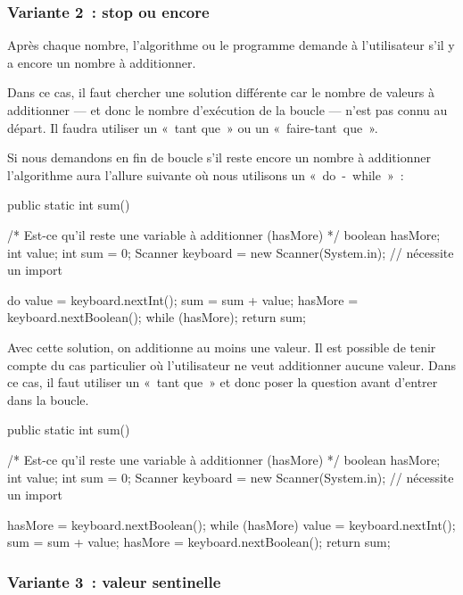 	\subsubsection{Variante 2~: stop ou encore}
	
		Après chaque nombre, l'algorithme ou le programme demande
		à l’utilisateur s’il y a encore un nombre à additionner.

		Dans ce cas, il faut chercher une solution différente car le nombre de
		valeurs à additionner — et donc le nombre d’exécution de la boucle
		— n'est pas connu au départ. Il faudra utiliser un «~tant que~» ou un
		«~faire-tant~que~». 
		
		Si nous demandons en fin de boucle s’il reste encore un nombre
		à additionner l'algorithme aura l'allure suivante où nous utilisons un
		«~do~-~while~»~:

		\begin{java}
public static int sum(){
	/* Est-ce qu'il reste une variable à additionner (hasMore) */
	boolean hasMore;
	int value;
	int sum = 0;
	Scanner keyboard = new Scanner(System.in); // nécessite un import

	do {
		value = keyboard.nextInt();
		sum = sum + value;
		hasMore = keyboard.nextBoolean();
	} while (hasMore);
	return sum;
}
		\end{java}
		
		Avec cette solution, on additionne au moins une valeur.  Il est possible
		de tenir compte du cas particulier où l’utilisateur ne veut additionner
		aucune valeur. Dans ce cas, il faut utiliser un «~tant que~» et donc
		poser la question avant d’entrer dans la boucle.

		\begin{java}
public static int sum(){
	/* Est-ce qu'il reste une variable à additionner (hasMore) */
	boolean hasMore;
	int value;
	int sum = 0;
	Scanner keyboard = new Scanner(System.in); // nécessite un import

	hasMore = keyboard.nextBoolean();
	while (hasMore){
		value = keyboard.nextInt();
		sum = sum + value;
		hasMore = keyboard.nextBoolean();
	}
	return sum;
}
		\end{java}


	\subsubsection{Variante 3~: valeur sentinelle}
		
